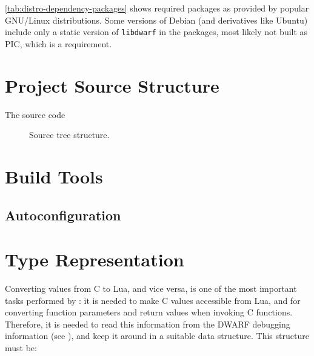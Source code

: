\autoref{tab:distro-dependency-packages} shows required packages as provided
by popular GNU/Linux distributions. Some versions of Debian (and derivatives
like Ubuntu) include only a static version of \verb|libdwarf| in the packages,
most likely not built as \gls{PIC}, which is a requirement.

\section{Project Source Structure}

The \Eris* source code

\begin{figure}[h]
    \centering
    \noindent\begin{minipage}{0.75\textwidth}
    \end{minipage}
    \caption{Source tree structure.}
\end{figure}


\section{Build Tools}

\subsection{Autoconfiguration}
  \label{sec:running-configure}


\section{Type Representation}

Converting values from C to Lua, and vice versa, is one of the most important
tasks performed by \Eris*: it is needed to make C values accessible from Lua,
and for converting function parameters and return values when invoking
C functions. Therefore, it is needed to read this information from the DWARF
debugging information (see ), and keep it
around in a suitable data structure. This structure must be:

